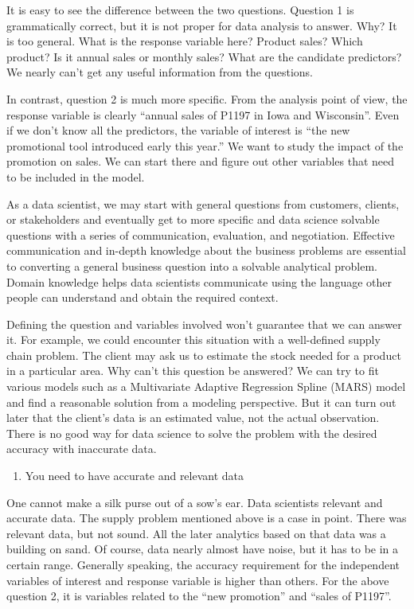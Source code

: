 \documentclass[
  12pt,
]{krantz}
\providecommand{\tightlist}{%
  \setlength{\itemsep}{0pt}\setlength{\parskip}{0pt}}
\begin{document}
It is easy to see the difference between the two questions. Question 1 is grammatically correct, but it is not proper for data analysis to answer. Why? It is too general. What is the response variable here? Product sales? Which product? Is it annual sales or monthly sales? What are the candidate predictors? We nearly can't get any useful information from the questions.

In contrast, question 2 is much more specific. From the analysis point of view, the response variable is clearly ``annual sales of P1197 in Iowa and Wisconsin''. Even if we don't know all the predictors, the variable of interest is ``the new promotional tool introduced early this year.'' We want to study the impact of the promotion on sales. We can start there and figure out other variables that need to be included in the model.

As a data scientist, we may start with general questions from customers, clients, or stakeholders and eventually get to more specific and data science solvable questions with a series of communication, evaluation, and negotiation. Effective communication and in-depth knowledge about the business problems are essential to converting a general business question into a solvable analytical problem. Domain knowledge helps data scientists communicate using the language other people can understand and obtain the required context.

Defining the question and variables involved won't guarantee that we can answer it. For example, we could encounter this situation with a well-defined supply chain problem. The client may ask us to estimate the stock needed for a product in a particular area. Why can't this question be answered? We can try to fit various models such as a Multivariate Adaptive Regression Spline (MARS) model and find a reasonable solution from a modeling perspective. But it can turn out later that the client's data is an estimated value, not the actual observation. There is no good way for data science to solve the problem with the desired accuracy with inaccurate data.

\begin{enumerate}
\def\labelenumi{\arabic{enumi}.}
\setcounter{enumi}{1}
\tightlist
\item
  You need to have accurate and relevant data
\end{enumerate}

One cannot make a silk purse out of a sow's ear. Data scientists relevant and accurate data. The supply problem mentioned above is a case in point. There was relevant data, but not sound. All the later analytics based on that data was a building on sand. Of course, data nearly almost have noise, but it has to be in a certain range. Generally speaking, the accuracy requirement for the independent variables of interest and response variable is higher than others. For the above question 2, it is variables related to the ``new promotion'' and ``sales of P1197''.
\end{document}
